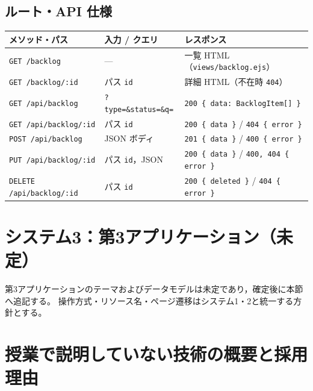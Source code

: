 \documentclass[
  a4paper,
  fontsize=11pt,
  line_length=40zw,
  number_of_lines=35,
  baselineskip=1.7zw
]{jlreq}
\begin{document}
\subsection{ルート・API 仕様}
\begin{table}[htbp]
  \centering
  \small
  \begin{tabularx}{\textwidth}{llX}
    \toprule
    メソッド・パス & 入力 / クエリ & レスポンス \\
    \midrule
    \texttt{GET /backlog} & — & 一覧 HTML（\texttt{views/backlog.ejs}） \\
    \texttt{GET /backlog/:id} & パス \texttt{id} & 詳細 HTML（不在時 \texttt{404}） \\
    \texttt{GET /api/backlog} & \texttt{?type=\&status=\&q=} & \texttt{200 \{ data: BacklogItem[] \}} \\
    \texttt{GET /api/backlog/:id} & パス \texttt{id} & \texttt{200 \{ data \}} / \texttt{404 \{ error \}} \\
    \texttt{POST /api/backlog} & JSON ボディ & \texttt{201 \{ data \}} / \texttt{400 \{ error \}} \\
    \texttt{PUT /api/backlog/:id} & パス \texttt{id}，JSON & \texttt{200 \{ data \}} / \texttt{400, 404 \{ error \}} \\
    \texttt{DELETE /api/backlog/:id} & パス \texttt{id} & \texttt{200 \{ deleted \}} / \texttt{404 \{ error \}} \\
    \bottomrule
  \end{tabularx}
\end{table}

\section{システム3：第3アプリケーション（未定）}

第3アプリケーションのテーマおよびデータモデルは未定であり，確定後に本節へ追記する。
操作方式・リソース名・ページ遷移はシステム1・2と統一する方針とする。

\section{授業で説明していない技術の概要と採用理由}
\end{document}
